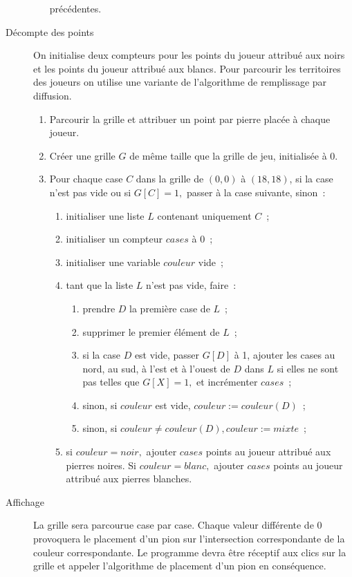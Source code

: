 \begin{description}
\begin{enumerate}
        précédentes.
    \end{enumerate}
    \item[Décompte des points] On initialise deux compteurs pour les points
    du joueur attribué aux noirs et les points du joueur attribué aux blancs.
    Pour parcourir les territoires des joueurs on utilise une variante de
    l'algorithme de remplissage par diffusion.~\cite{ggo-algofloodfill}
    \begin{enumerate}
        \item Parcourir la grille et attribuer un point par pierre placée à chaque joueur.
        \item Créer une grille $G$ de même taille que la grille de jeu, initialisée à 0.
        \item Pour chaque case $C$ dans la grille de $(0,0)$ à $(18,18)$, si la case n'est
        pas vide ou si $G[C] = 1,$ passer à la case suivante, sinon~:
        \begin{enumerate}
            \item initialiser une liste $L$ contenant uniquement $C$~;
            \item initialiser un compteur $cases$ à 0~;
            \item initialiser une variable $couleur$ vide~;
            \item tant que la liste $L$ n'est pas vide, faire~:
            \begin{enumerate}
                \item prendre $D$ la première case de $L$~;
                \item supprimer le premier élément de $L$~;
                \item si la case $D$ est vide, passer $G[D]$ à 1,
                ajouter les cases au nord, au sud, à l'est et à l'ouest de $D$ dans $L$ si
                elles ne sont pas telles que $G[X] = 1,$ et incrémenter $cases$~;
                \item sinon, si $couleur$ est vide, $couleur := couleur(D)$~;
                \item sinon, si $couleur \neq couleur(D), couleur := mixte$~;
            \end{enumerate}
            \item si $couleur = noir,$ ajouter $cases$ points au joueur attribué
            aux pierres noires. Si $couleur = blanc,$ ajouter $cases$ points
            au joueur attribué aux pierres blanches.
        \end{enumerate}
    \end{enumerate}
    \item[Affichage] La grille sera parcourue case par case. Chaque valeur
    différente de 0 provoquera le placement d'un pion sur l'intersection
    correspondante de la couleur correspondante. Le programme devra
    être réceptif aux clics sur la grille et appeler l'algorithme de placement
    d'un pion en conséquence.
\end{description}

